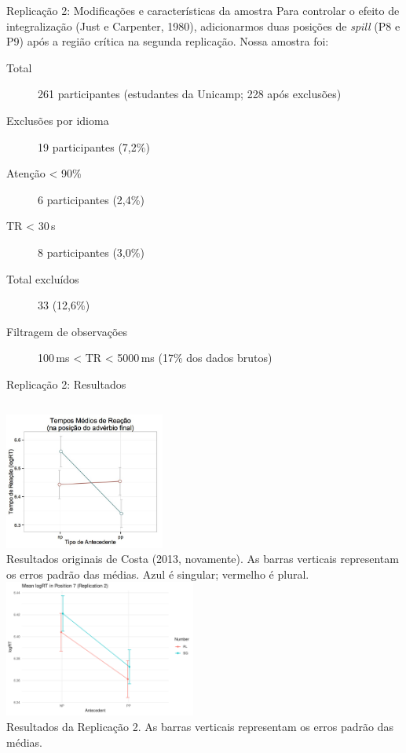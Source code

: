 \documentclass[numbering=fraction,aspectratio=169]{beamer}
\newcommand{\FigureCaption}[1]{{\scriptsize #1}}
\begin{document}
\begin{frame}{Replicação 2: Modificações e características da amostra}
  Para controlar o efeito de integralização (Just e Carpenter, 1980), adicionarmos \alert{duas posições de \emph{spill} (P8 e P9) após a região crítica} na segunda replicação. Nossa amostra foi:

  \begin{description}
  \item[Total] 261 participantes (estudantes da Unicamp; \alert{228 após exclusões})
  \item[Exclusões por idioma] 19 participantes (7,2\%)
  \item[Atenção < 90\%] 6 participantes (2,4\%)
  \item[TR < 30\,s] 8 participantes (3,0\%)
  \item[Total excluídos] 33 (12,6\%)
  \item[Filtragem de observações] 100\,ms < TR < 5000\,ms (17\% dos dados brutos)
  \end{description}
\end{frame}

\begin{frame}{Replicação 2: Resultados}
  \begin{columns}
    \centering
    \includegraphics[height=4.5cm]{img/costa2013-results}\\
    \FigureCaption{Resultados originais de Costa (2013, novamente). As barras verticais representam os erros padrão das médias. Azul é singular; vermelho é plural.}
    \centering
    \includegraphics[height=4.5cm]{img/R2-results}\\
    \FigureCaption{Resultados da Replicação 2. As barras verticais representam os erros padrão das médias.}
  \end{columns}
\end{frame}
\end{document}
